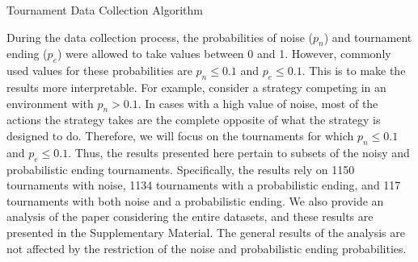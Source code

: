\documentclass{article}
\begin{document}
\begin{algorithm}[!htbp]
    \;
    \caption{Tournament Data Collection Algorithm}
    \label{algorithm:data_generation}
\end{algorithm}

During the data collection process, the probabilities of noise (\(p_n\)) and
tournament ending (\(p_e\)) were allowed to take values between 0 and 1.
However, commonly used values for these probabilities are \(p_n \leq 0.1\) and
\(p_e \leq 0.1\). This is to make the results more interpretable. For example,
consider a strategy competing in an environment with \(p_n > 0.1\). In cases
with a high value of noise, most of the actions the strategy takes are the
complete opposite of what the strategy is designed to do. Therefore, we will
focus on the tournaments for which \(p_n \leq 0.1\) and \(p_e \leq 0.1\). Thus,
the results presented here pertain to subsets of the noisy and probabilistic
ending tournaments. Specifically, the results rely on 1150 tournaments with
noise, 1134 tournaments with a probabilistic ending, and 117 tournaments with
both noise and a probabilistic ending. We also provide an analysis of the paper
considering the entire datasets, and these results are presented in the
Supplementary Material. The general results of the analysis are not affected by
the restriction of the noise and probabilistic ending probabilities.
\end{document}
